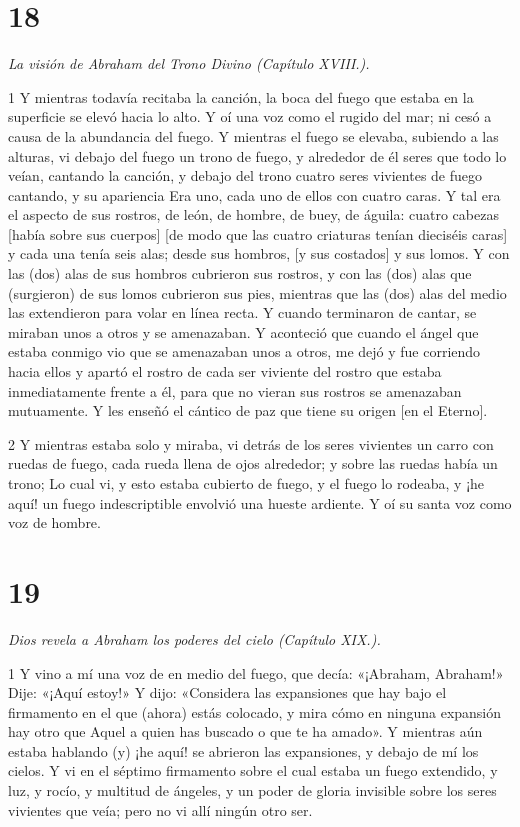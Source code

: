 \chapter{18}

\par \textit{La visión de Abraham del Trono Divino (Capítulo XVIII.).}

\par 1 Y mientras todavía recitaba la canción, la boca del fuego que estaba en la superficie se elevó hacia lo alto. Y oí una voz como el rugido del mar; ni cesó a causa de la abundancia del fuego. Y mientras el fuego se elevaba, subiendo a las alturas, vi debajo del fuego un trono de fuego, y alrededor de él seres que todo lo veían, cantando la canción, y debajo del trono cuatro seres vivientes de fuego cantando, y su apariencia Era uno, cada uno de ellos con cuatro caras. Y tal era el aspecto de sus rostros, de león, de hombre, de buey, de águila: cuatro cabezas [había sobre sus cuerpos] [de modo que las cuatro criaturas tenían dieciséis caras] y cada una tenía seis alas; desde sus hombros, [y sus costados] y sus lomos. Y con las (dos) alas de sus hombros cubrieron sus rostros, y con las (dos) alas que (surgieron) de sus lomos cubrieron sus pies, mientras que las (dos) alas del medio las extendieron para volar en línea recta. Y cuando terminaron de cantar, se miraban unos a otros y se amenazaban. Y aconteció que cuando el ángel que estaba conmigo vio que se amenazaban unos a otros, me dejó y fue corriendo hacia ellos y apartó el rostro de cada ser viviente del rostro que estaba inmediatamente frente a él, para que no vieran sus rostros se amenazaban mutuamente. Y les enseñó el cántico de paz que tiene su origen [en el Eterno].

\par 2 Y mientras estaba solo y miraba, vi detrás de los seres vivientes un carro con ruedas de fuego, cada rueda llena de ojos alrededor; y sobre las ruedas había un trono; Lo cual vi, y esto estaba cubierto de fuego, y el fuego lo rodeaba, y ¡he aquí! un fuego indescriptible envolvió una hueste ardiente. Y oí su santa voz como voz de hombre.

\chapter{19}

\par \textit{Dios revela a Abraham los poderes del cielo (Capítulo XIX.).}

\par 1 Y vino a mí una voz de en medio del fuego, que decía: «¡Abraham, Abraham!» Dije: «¡Aquí estoy!» Y dijo: «Considera las expansiones que hay bajo el firmamento en el que (ahora) estás colocado, y mira cómo en ninguna expansión hay otro que Aquel a quien has buscado o que te ha amado». Y mientras aún estaba hablando (y) ¡he aquí! se abrieron las expansiones, y debajo de mí los cielos. Y vi en el séptimo firmamento sobre el cual estaba un fuego extendido, y luz, y rocío, y multitud de ángeles, y un poder de gloria invisible sobre los seres vivientes que veía; pero no vi allí ningún otro ser.

